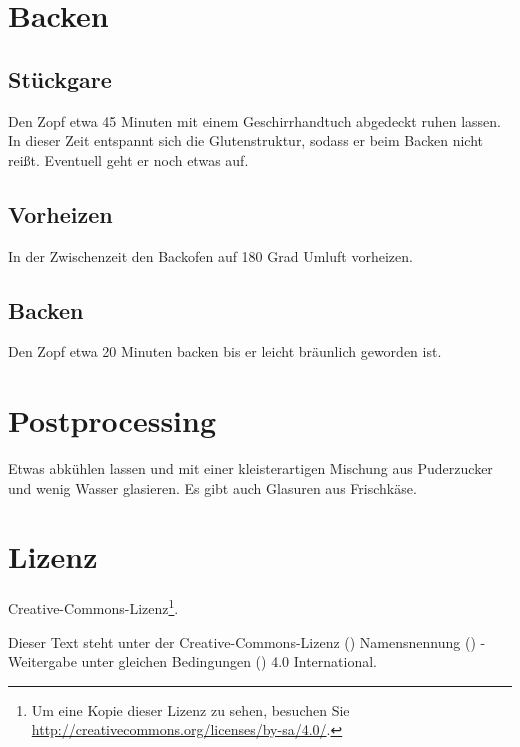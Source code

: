 \documentclass[a4paper, oneside]{recipe}
\begin{document}
\section*{Backen}
\subsection*{Stückgare}
Den Zopf etwa 45 Minuten mit einem Geschirrhandtuch abgedeckt ruhen lassen. In dieser Zeit entspannt sich die Glutenstruktur, sodass er beim Backen nicht reißt. Eventuell geht er noch etwas auf.

\subsection*{Vorheizen}
In der Zwischenzeit den Backofen auf 180 Grad Umluft vorheizen.

\subsection*{Backen}
Den Zopf etwa 20 Minuten backen bis er leicht bräunlich geworden ist.

\section*{Postprocessing}
Etwas abkühlen lassen und mit einer kleisterartigen Mischung aus Puderzucker und wenig Wasser glasieren. Es gibt auch Glasuren aus Frischkäse.

\section*{Lizenz}
\ccbysa{} Creative-Commons-Lizenz\footnote{Um eine Kopie dieser Lizenz zu sehen, besuchen Sie \url{http://creativecommons.org/licenses/by-sa/4.0/}.}.

Dieser Text steht unter der Creative-Commons-Lizenz (\ccLogo) Namensnennung (\ccAttribution) - Weitergabe unter gleichen Bedingungen (\ccShareAlike) 4.0 International. 
\end{document}
